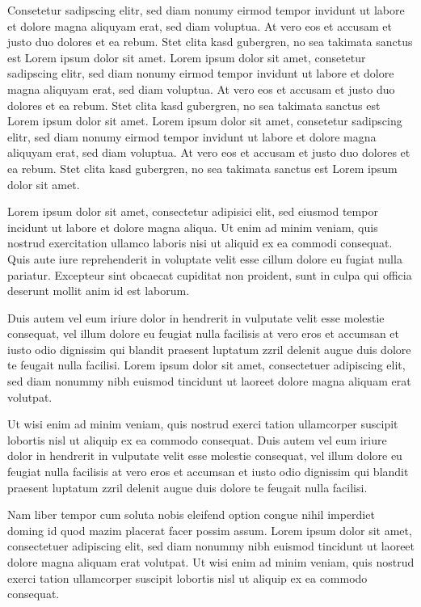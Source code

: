 \documentclass[twoside,a4paper]{article}
\begin{document}
Consetetur sadipscing elitr, sed diam nonumy eirmod tempor invidunt ut
labore et dolore magna aliquyam erat, sed diam voluptua. At vero eos
et accusam et justo duo dolores et ea rebum. Stet clita kasd
gubergren, no sea takimata sanctus est Lorem ipsum dolor sit
amet. Lorem ipsum dolor sit amet, consetetur sadipscing elitr, sed
diam nonumy eirmod tempor invidunt ut labore et dolore magna aliquyam
erat, sed diam voluptua. At vero eos et accusam et justo duo dolores
et ea rebum. Stet clita kasd gubergren, no sea takimata sanctus est
Lorem ipsum dolor sit amet. Lorem ipsum dolor sit amet, consetetur
sadipscing elitr, sed diam nonumy eirmod tempor invidunt ut labore et
dolore magna aliquyam erat, sed diam voluptua. At vero eos et accusam
et justo duo dolores et ea rebum. Stet clita kasd gubergren, no sea
takimata sanctus est Lorem ipsum dolor sit amet.

Lorem ipsum dolor sit amet, consectetur adipisici elit, sed eiusmod
tempor incidunt ut labore et dolore magna aliqua. Ut enim ad minim
veniam, quis nostrud exercitation ullamco laboris nisi ut aliquid ex
ea commodi consequat. Quis aute iure reprehenderit in voluptate velit
esse cillum dolore eu fugiat nulla pariatur. Excepteur sint obcaecat
cupiditat non proident, sunt in culpa qui officia deserunt mollit anim
id est laborum.


Duis autem vel eum iriure dolor in hendrerit in vulputate velit esse
molestie consequat, vel illum dolore eu feugiat nulla facilisis at
vero eros et accumsan et iusto odio dignissim qui blandit praesent
luptatum zzril delenit augue duis dolore te feugait nulla
facilisi. Lorem ipsum dolor sit amet, consectetuer adipiscing elit,
sed diam nonummy nibh euismod tincidunt ut laoreet dolore magna
aliquam erat volutpat.

Ut wisi enim ad minim veniam, quis nostrud exerci tation ullamcorper
suscipit lobortis nisl ut aliquip ex ea commodo consequat. Duis autem
vel eum iriure dolor in hendrerit in vulputate velit esse molestie
consequat, vel illum dolore eu feugiat nulla facilisis at vero eros et
accumsan et iusto odio dignissim qui blandit praesent luptatum zzril
delenit augue duis dolore te feugait nulla facilisi.

Nam liber tempor cum soluta nobis eleifend option congue nihil
imperdiet doming id quod mazim placerat facer possim assum. Lorem
ipsum dolor sit amet, consectetuer adipiscing elit, sed diam nonummy
nibh euismod tincidunt ut laoreet dolore magna aliquam erat
volutpat. Ut wisi enim ad minim veniam, quis nostrud exerci tation
ullamcorper suscipit lobortis nisl ut aliquip ex ea commodo consequat.
\end{document}
